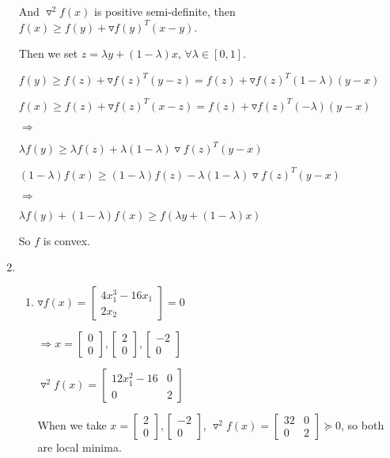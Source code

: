 \documentclass[12pt]{article}
\begin{document}
\begin{enumerate}
And $\triangledown^2 f(x)$ is positive semi-definite, then $f(x) \ge f(y) + \triangledown f(y)^T (x-y)$.

Then we set $z = \lambda y + (1-\lambda) x$, $\forall \lambda \in [0, 1]$.

$f(y) \ge f(z) + \triangledown f(z)^T (y-z) =  f(z) + \triangledown f(z)^T (1-\lambda)(y-x)$

$f(x) \ge f(z) + \triangledown f(z)^T (x-z) =  f(z) + \triangledown f(z)^T (-\lambda)(y-x)$

$\Longrightarrow$

$\lambda f(y) \ge \lambda f(z) + \lambda(1-\lambda) \triangledown f(z)^T (y-x)$

$(1-\lambda) f(x) \ge (1-\lambda) f(z) - \lambda(1-\lambda) \triangledown f(z)^T (y-x)$

$\Longrightarrow$

$\lambda f(y) + (1-\lambda) f(x) \ge f(\lambda y + (1-\lambda)x)$

So $f$ is convex.

\bigskip
\item
\begin{enumerate}
\item
$\triangledown f(x) = \begin{bmatrix} 4x_1^3 - 16 x_1 \\ 2x_2 \end{bmatrix}=0 $

$\Longrightarrow x = \begin{bmatrix} 0 \\ 0\end{bmatrix}, \begin{bmatrix} 2 \\ 0\end{bmatrix}, \begin{bmatrix} -2 \\ 0\end{bmatrix}$

$\triangledown^2 f(x) = \begin{bmatrix}12x_1^2 - 16 & 0 \\ 0 & 2 \end{bmatrix}$

When we take $x = \begin{bmatrix} 2 \\ 0\end{bmatrix}, \begin{bmatrix} -2 \\ 0\end{bmatrix} $, $\triangledown^2 f(x) = \begin{bmatrix}32 & 0 \\ 0 & 2 \end{bmatrix} \succeq 0$, so both are local minima.


\end{enumerate}
\end{enumerate}
\end{document}
